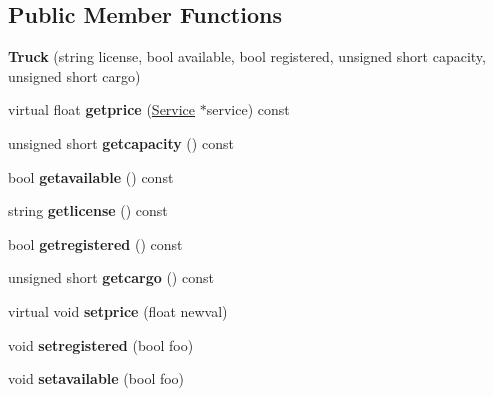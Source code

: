 \subsection*{Public Member Functions}
\begin{DoxyCompactItemize}
\item 
\mbox{\label{class_truck_a310563b5c12feb94c1e1f8f855c1ee05}} 
{\bfseries Truck} (string license, bool available, bool registered, unsigned short capacity, unsigned short cargo)
\item 
\mbox{\label{class_truck_a2f11c2039060bcc94ce5d6784035f1bc}} 
virtual float {\bfseries getprice} (\hyperlink{class_service}{Service} $\ast$service) const
\item 
\mbox{\label{class_truck_ad775a01ae4cb8c36d6e2438f4dd37792}} 
unsigned short {\bfseries getcapacity} () const
\item 
\mbox{\label{class_truck_a0eaa329bc72bf0171f7ec2a0a6240156}} 
bool {\bfseries getavailable} () const
\item 
\mbox{\label{class_truck_ae76a7ae2343557680ae915c6c6d42ff8}} 
string {\bfseries getlicense} () const
\item 
\mbox{\label{class_truck_a830838ed22465cf27f56b911c3fadf13}} 
bool {\bfseries getregistered} () const
\item 
\mbox{\label{class_truck_a1bc18daed6fb7f0b900dac32013a250f}} 
unsigned short {\bfseries getcargo} () const
\item 
\mbox{\label{class_truck_a22d2dc22b1c5b9652d463ec624442403}} 
virtual void {\bfseries setprice} (float newval)
\item 
\mbox{\label{class_truck_a9268e17e1a967d1702b28c6940403aa4}} 
void {\bfseries setregistered} (bool foo)
\item 
\mbox{\label{class_truck_a59ca935a364da118131ed85647aa4f0d}} 
void {\bfseries setavailable} (bool foo)
\item 
\mbox{\label{class_truck_a38f09eab2822524e355ecf6d0a13f7de}} 

\end{DoxyCompactItemize}
